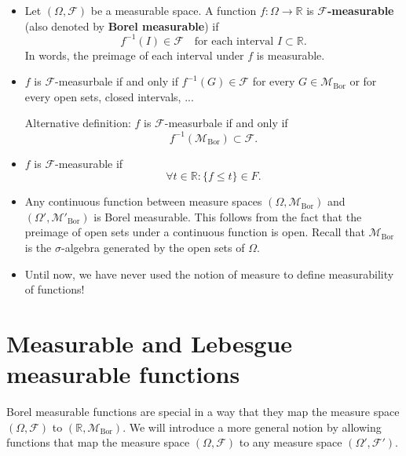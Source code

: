 \documentclass[a4paper, 11pt]{article}
\theoremstyle{plain}
\theoremstyle{definition}
\begin{document}
\begin{itemize}
	\item Let $(\Omega, \mathcal F)$ be a measurable space. A function $f: \Omega \to \mathbb R$ is \textbf{$\mathcal F$-measurable} (also denoted by \textbf{Borel measurable}) if $$f^{-1}(I) \in \mathcal F \quad \text{for each interval $I \subset \mathbb R$}. $$
	In words, the preimage of each interval under $f$ is measurable.
	
	\item $f$ is $\mathcal F$-measurbale if and only if $f^{-1}(G) \in \mathcal F$ for every $G \in \mathcal M_{\mathrm{Bor}}$ or for every open sets, closed intervals, ...
	
	 Alternative definition: $f$ is $\mathcal F$-measurbale if and only if
	\[
	f^{-1}(\mathcal M_{\mathrm{Bor}}) \subset \mathcal F.
	\]
	
	\item $f$ is $\mathcal F$-measurable if 
	\[
		\forall t \in \mathbb R: \{ f \leq t \} \in F.
	\]
	
	\item Any continuous function between measure spaces $(\Omega, \mathcal M_{\mathrm{Bor}})$ and $(\Omega', \mathcal M'_{\mathrm{Bor}})$ is Borel measurable. This follows from the fact that the preimage of open sets under a continuous function is open. Recall that $\mathcal M_{\mathrm{Bor}}$ is the $\sigma$-algebra generated by the open sets of $\Omega$.
	 
	\item Until now, we have never used the notion of measure to define measurability of functions!
\end{itemize}

\section{Measurable and Lebesgue measurable functions}
Borel measurable functions are special in a way that they map the measure space $(\Omega, \mathcal F)$ to $(\mathbb R, \mathcal M_{\mathrm{Bor}})$. We will introduce a more general notion by allowing functions that map  the measure space $(\Omega, \mathcal F)$ to any measure space $(\Omega', \mathcal F')$.\\
\end{document}
